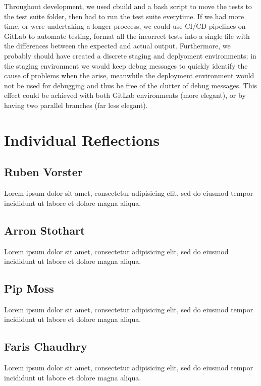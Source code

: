 \documentclass[11pt]{article}
\begin{document}
Throughout development, we used cbuild and a bash script to move the tests to the test suite folder, then had to run the test suite everytime. If we had more time, or were undertaking a longer proccess, we could use CI/CD pipelines on GitLab to automate testing, format all the incorrect tests into a single file with the differences between the expected and actual output. Furthermore, we probably should have created a discrete staging and deplyoment environments; in the staging environment we would keep debug messages to quickly identify the cause of problems when the arise, meanwhile the deployment environment would not be used for debugging and thus be free of the clutter of debug messages. This effect could be achieved with both GitLab environments (more elegant), or by having two parallel branches (far less elegant).

\section{Individual Reflections}
\subsection{Ruben Vorster}
Lorem ipsum dolor sit amet, consectetur adipisicing elit, sed do eiusmod tempor
incididunt ut labore et dolore magna aliqua.
\subsection{Arron Stothart}
Lorem ipsum dolor sit amet, consectetur adipisicing elit, sed do eiusmod 
incididunt ut labore et dolore magna aliqua.
\subsection{Pip Moss}
Lorem ipsum dolor sit amet, consectetur adipisicing elit, sed do eiusmod tempor
incididunt ut labore et dolore magna aliqua.
\subsection{Faris Chaudhry}
Lorem ipsum dolor sit amet, consectetur adipisicing elit, sed do eiusmod tempor
incididunt ut labore et dolore magna aliqua.
\end{document}
